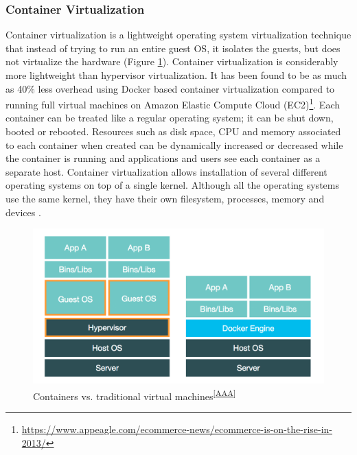 \documentclass[a4paper,11pt,twoside]{report}
\begin{document}
\subsubsection*{Container Virtualization} 
Container virtualization is a lightweight operating system virtualization technique that instead of trying to run an entire guest OS, it isolates the guests, but does not virtualize the hardware  \cite{container} (Figure \ref{vm vs container}). Container virtualization is considerably more lightweight than hypervisor virtualization. It has been found to be as much as 40\% less overhead using Docker based container virtualization compared to running full virtual machines on Amazon Elastic Compute Cloud (EC2)\footnote{\url{https://www.appeagle.com/ecommerce-news/ecommerce-is-on-the-rise-in-2013/}}. Each container can be treated like a regular operating system; it can be shut down, booted or rebooted. Resources such as disk space, CPU and memory associated to each container when created can be dynamically increased or decreased while the container is running and applications and users see each container as a separate host. Container virtualization allows installation of several different operating systems on top of a single kernel. Although all the operating systems use the same kernel, they have their own filesystem, processes, memory and devices \cite{container}. \bigskip


\begin{figure}[!ht]
  \centering
     \includegraphics[scale=1]{containervsvm}
  \caption{Containers vs. traditional virtual machines\textsuperscript{\ref{AAA}}}%
  \label{vm vs container}  
\end{figure}
\vspace{-18pt}
\end{document}
